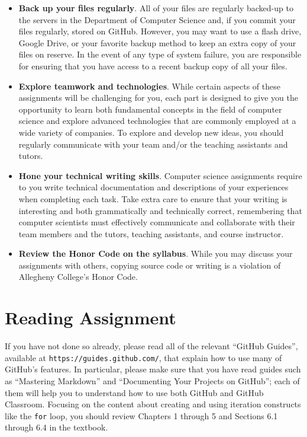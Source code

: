 \documentclass[11pt]{article}
\newcommand{\program}[1]{\lstinline{#1}}
\newcommand{\url}[1]{\lstinline{#1}}
\begin{document}
\begin{itemize}
\item {\bf Back up your files regularly}. All of your files are regularly backed-up to the servers in the Department of
  Computer Science and, if you commit your files regularly, stored on GitHub. However, you may want to use a flash
  drive, Google Drive, or your favorite backup method to keep an extra copy of your files on reserve. In the event of
  any type of system failure, you are responsible for ensuring that you have access to a recent backup copy of all your
  files.

\item {\bf Explore teamwork and technologies}. While certain aspects of these assignments will be challenging for you,
  each part is designed to give you the opportunity to learn both fundamental concepts in the field of computer science
  and explore advanced technologies that are commonly employed at a wide variety of companies. To explore and develop
  new ideas, you should regularly communicate with your team and/or the teaching assistants and tutors.

\item {\bf Hone your technical writing skills}. Computer science assignments require to you write technical
  documentation and descriptions of your experiences when completing each task. Take extra care to ensure that your
  writing is interesting and both grammatically and technically correct, remembering that computer scientists must
  effectively communicate and collaborate with their team members and the tutors, teaching assistants, and course
  instructor.

\item {\bf Review the Honor Code on the syllabus}. While you may discuss your assignments with others, copying source
  code or writing is a violation of Allegheny College's Honor Code.

\end{itemize}

\section*{Reading Assignment}

If you have not done so already, please read all of the relevant ``GitHub Guides'', available at
\url{https://guides.github.com/}, that explain how to use many of GitHub's features. In particular, please make sure
that you have read guides such as ``Mastering Markdown'' and ``Documenting Your Projects on GitHub''; each of them will
help you to understand how to use both GitHub and GitHub Classroom. Focusing on the content about creating and using
iteration constructs like the \program{for} loop, you should review Chapters 1 through 5 and Sections 6.1 through 6.4 in
the textbook.
\end{document}
